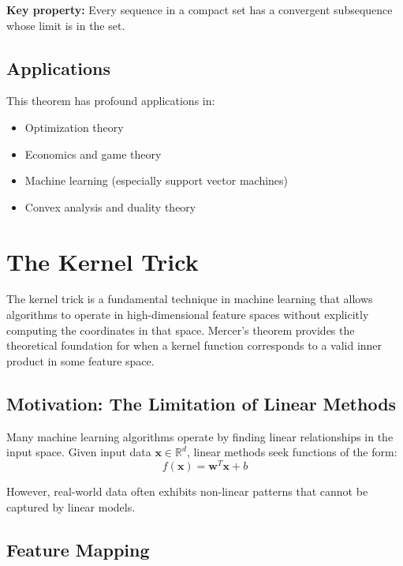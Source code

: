 \documentclass{tufte-handout}
\begin{document}
\textbf{Key property:} Every sequence in a compact set has a convergent subsequence whose limit is in the set.



\subsection{Applications}

This theorem has profound applications in:
\begin{itemize}
    \item Optimization theory
    \item Economics and game theory
    \item Machine learning (especially support vector machines)
    \item Convex analysis and duality theory
\end{itemize}



\section{The Kernel Trick}

The kernel trick is a fundamental technique in machine learning that allows algorithms to operate in high-dimensional feature spaces without explicitly computing the coordinates in that space. Mercer's theorem provides the theoretical foundation for when a kernel function corresponds to a valid inner product in some feature space.


\subsection{Motivation: The Limitation of Linear Methods}

Many machine learning algorithms operate by finding linear relationships in the input space. Given input data $\mathbf{x} \in \mathbb{R}^d$, linear methods seek functions of the form:
\begin{equation}
f(\mathbf{x}) = \mathbf{w}^T\mathbf{x} + b
\end{equation}

However, real-world data often exhibits non-linear patterns that cannot be captured by linear models.

\subsection{Feature Mapping}
\end{document}
